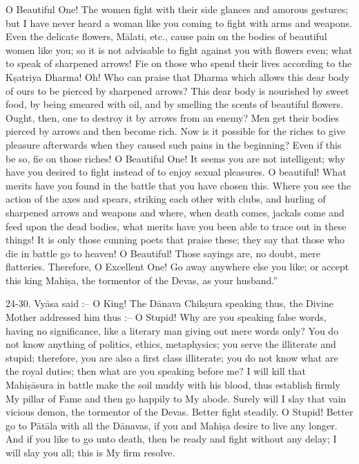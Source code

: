 O Beautiful One! The women fight with their side glances and amorous gestures; but I have never heard a woman like you coming to fight with arms and weapons. Even the delicate flowers, M\=alati, etc., cause pain on the bodies of beautiful women like you; so it is not advisable to fight against you with flowers even; what to speak of sharpened arrows! Fie on those who spend their lives according to the K\d{s}atriya Dharma! Oh! Who can praise that Dharma which allows this dear body of ours to be pierced by sharpened arrows? This dear body is nourished by sweet food, by being smeared with oil, and by smelling the scents of beautiful flowers. Ought, then, one to destroy it by arrows from an enemy? Men get their bodies pierced by arrows and then become rich. Now is it possible for the riches to give pleasure afterwards when they caused such pains in the beginning? Even if this be so, fie on those riches! O Beautiful One! It seems you are not intelligent; why have you desired to fight instead of to enjoy sexual pleasures. O beautiful! What merits have you found in the battle that you have chosen this. Where you see the action of the axes and spears, striking each other with clubs, and hurling of sharpened arrows and weapons and where, when death comes, jackals come and feed upon the dead bodies, what merits have you been able to trace out in these things! It is only those cunning poets that praise these; they say that those who die in battle go to heaven! O Beautiful! Those sayings are, no doubt, mere flatteries. Therefore, O Excellent One! Go away anywhere else you like; or accept this king Mahi\d{s}a, the tormentor of the Devas, as your husband.''

24-30. Vy\=asa said :-- O King! The D\=anava Chik\d{s}ura speaking thus, the Divine Mother addressed him thus :-- O Stupid! Why are you speaking false words, having no significance, like a literary man giving out mere words only? You do not know anything of politics, ethics, metaphysics; you serve the illiterate and stupid; therefore, you are also a first class illiterate; you do not know what are the royal duties; then what are you speaking before me? I will kill that Mahi\d{s}\=asura in battle make the soil muddy with his blood, thus establish firmly My pillar of Fame and then go happily to My abode. Surely will I slay that vain vicious demon, the tormentor of the Devas. Better fight steadily. O Stupid! Better go to P\=at\=ala with all the D\=anavas, if you and Mahi\d{s}a desire to live any longer. And if you like to go unto death, then be ready and fight without any delay; I will slay you all; this is My firm resolve.

